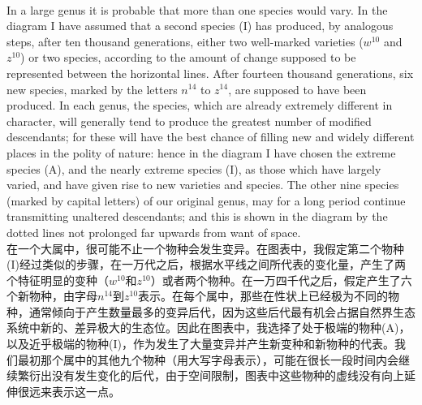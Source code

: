 \documentclass{article}
\begin{document}
\\
In a large genus it is probable that more than one species would vary. In the diagram I have assumed that a second species (I) has produced, by analogous steps, after ten thousand generations, either two well-marked varieties ($w^{10}$ and $z^{10}$) or two species, according to the amount of change supposed to be represented between the horizontal lines. After fourteen thousand generations, six new species, marked by the letters $n^{14}$ to $z^{14}$, are supposed to have been produced. In each genus, the species, which are already extremely different in character, will generally tend to produce the greatest number of modified descendants; for these will have the best chance of filling new and widely different places in the polity of nature: hence in the diagram I have chosen the extreme species (A), and the nearly extreme species (I), as those which have largely varied, and have given rise to new varieties and species. The other nine species (marked by capital letters) of our original genus, may for a long period continue transmitting unaltered descendants; and this is shown in the diagram by the dotted lines not prolonged far upwards from want of space.\\
在一个大属中，很可能不止一个物种会发生变异。在图表中，我假定第二个物种(I)经过类似的步骤，在一万代之后，根据水平线之间所代表的变化量，产生了两个特征明显的变种（$w^{10}$和$z^{10}$）或者两个物种。在一万四千代之后，假定产生了六个新物种，由字母$n^{14}$到$z^{10}$表示。在每个属中，那些在性状上已经极为不同的物种，通常倾向于产生数量最多的变异后代，因为这些后代最有机会占据自然界生态系统中新的、差异极大的生态位。因此在图表中，我选择了处于极端的物种(A)，以及近乎极端的物种(I)，作为发生了大量变异并产生新变种和新物种的代表。我们最初那个属中的其他九个物种（用大写字母表示），可能在很长一段时间内会继续繁衍出没有发生变化的后代，由于空间限制，图表中这些物种的虚线没有向上延伸很远来表示这一点。 \\
\end{document}
